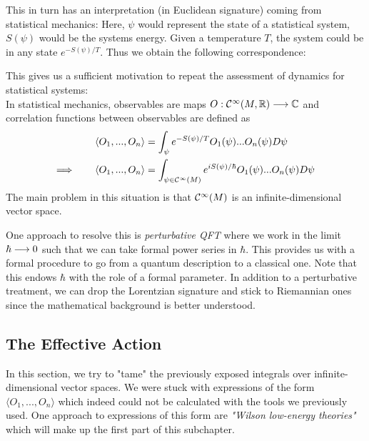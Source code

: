 This in turn has an interpretation (in Euclidean signature) coming from statistical mechanics: Here, $\psi$ would represent the state of a statistical system, $S(\psi)$ would be the systems energy. Given a temperature $T$, the system could be in any state $e^{-S(\psi)/ T}$. Thus we obtain the following correspondence:
\begin{center}
\end{center}
This gives us a sufficient motivation to repeat the assessment of dynamics for statistical systems:\\

In statistical mechanics, observables are maps $O: \mathcal{C}^{\infty}(M,\mathbb{R}) \longrightarrow \mathbb{C}$ and correlation functions between observables are defined as
\begin{align}
  \langle O_1, ..., O_n \rangle &= \int_\psi e^{-S(\psi)/T} O_1(\psi) ... O_n(\psi) D\psi\\
  \Longrightarrow \quad \quad \langle O_1, ..., O_n \rangle &= \int_{\psi \in \mathcal{C}^{\infty}(M)} e^{i S(\psi)/\hbar} O_1(\psi) ... O_n(\psi) D\psi
\end{align}
The main problem in this situation is that $\mathcal{C}^{\infty}(M)$ is an infinite-dimensional vector space.

\begin{rem}
  One approach to resolve this is \emph{perturbative QFT} where we work in the limit $\hbar \longrightarrow 0$ such that we can take formal power series in $\hbar$. This provides us with a formal procedure to go from a quantum description to a classical one. Note that this endows $\hbar$ with the role of a formal parameter. In addition to a perturbative treatment, we can drop the Lorentzian signature and stick to Riemannian ones since the mathematical background is better understood.
\end{rem}


\subsection{The Effective Action}
\label{subsec:effective_action}

In this section, we try to "tame" the previously exposed integrals over infinite-dimensional vector spaces. We were stuck with expressions of the form $\langle O_1, ..., O_n \rangle$ which indeed could not be calculated with the tools we previously used. One approach to expressions of this form are \emph{"Wilson low-energy theories"} which will make up the first part of this subchapter.\\

